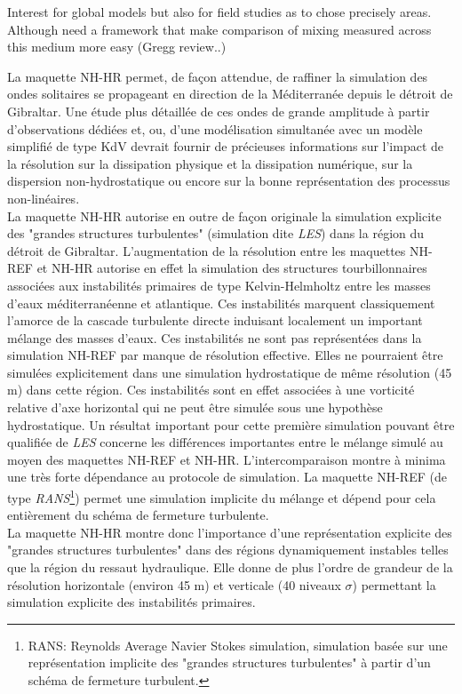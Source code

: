 Interest for global models but also for field studies as to chose precisely areas. Although need a framework that make comparison of mixing measured across this medium more easy (Gregg review..)



La maquette NH-HR permet, de façon attendue, de raffiner la simulation des ondes solitaires se propageant en direction de la Méditerranée depuis le détroit de Gibraltar. Une étude plus détaillée de ces ondes de grande amplitude à partir d'observations dédiées et, ou, d'une modélisation simultanée avec un modèle simplifié de type KdV devrait fournir de précieuses informations sur l'impact de la résolution sur la dissipation physique et la dissipation numérique, sur la dispersion non-hydrostatique ou encore sur la bonne représentation des processus non-linéaires.\\
La maquette  NH-HR autorise en outre de façon originale la simulation explicite des "grandes structures turbulentes" (simulation dite \textit{LES}) dans la région du détroit de Gibraltar. L'augmentation de la résolution entre les maquettes NH-REF et NH-HR autorise en effet la simulation des structures tourbillonnaires associées aux instabilités primaires de type Kelvin-Helmholtz entre les masses d'eaux méditerranéenne et atlantique. Ces instabilités marquent classiquement l'amorce de la cascade turbulente directe induisant localement un important mélange des masses d'eaux. Ces instabilités ne sont pas représentées dans la simulation NH-REF par manque de résolution effective. Elles ne pourraient être simulées explicitement dans une simulation hydrostatique de même résolution (45 m) dans cette région. Ces instabilités sont en effet associées à une vorticité relative d'axe horizontal qui ne peut être simulée sous une hypothèse hydrostatique. Un résultat important pour cette première simulation pouvant être qualifiée de \textit{LES} concerne les différences importantes entre le mélange simulé au moyen des maquettes NH-REF et NH-HR. L'intercomparaison montre à minima une très forte dépendance au protocole de simulation. La maquette NH-REF (de type \textit{RANS}\footnote{RANS: Reynolds Average Navier Stokes simulation, simulation basée sur une représentation implicite des "grandes structures turbulentes" à partir d'un schéma de fermeture turbulent.}) permet une simulation implicite du mélange et dépend pour cela entièrement du schéma de fermeture turbulente.\\
La maquette NH-HR montre donc l'importance d'une représentation explicite des "grandes structures turbulentes" dans des régions dynamiquement instables telles que la région du ressaut hydraulique. Elle donne de plus l'ordre de grandeur de la résolution horizontale (environ 45 m) et verticale (40 niveaux $\sigma$) permettant la simulation explicite des instabilités primaires.\\
